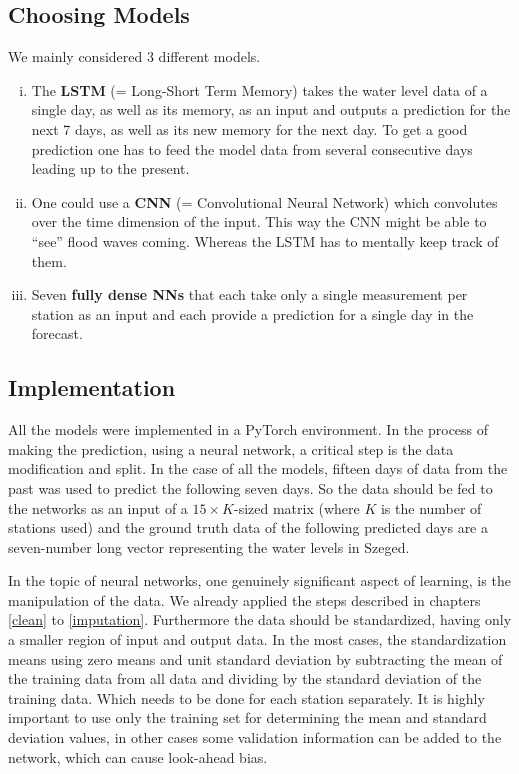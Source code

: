 \documentclass{article}
\newcommand{\tmstrong}[1]{\textbf{#1}}
\newenvironment{enumerateroman}{\begin{enumerate}[i.] }{\end{enumerate}}
\begin{document}
\subsection{Choosing Models}

We mainly considered 3 different models.
\begin{enumerateroman}
  \item The {\tmstrong{LSTM}} (= Long-Short Term Memory) takes the water level
  data of a single day, as well as its memory, as an input and outputs a
  prediction for the next 7 days, as well as its new memory for the next day.
  To get a good prediction one has to feed the model data from several
  consecutive days leading up to the present.
  
  \item One could use a {\tmstrong{CNN}} (= Convolutional Neural Network)
  which convolutes over the time dimension of the input. This way the CNN
  might be able to ``see'' flood waves coming. Whereas the LSTM has to
  mentally keep track of them.
  
  \item Seven {\tmstrong{fully dense NNs}} that each take only a single
  measurement per station as an input and each provide a prediction for a
  single day in the forecast.
\end{enumerateroman}

\subsection{Implementation}

All the models were implemented in a PyTorch environment. In the process of
making the prediction, using a neural network, a critical step is the data
modification and split. In the case of all the models, fifteen days of data
from the past was used to predict the following seven days. So the data should
be fed to the networks as an input of a $15 \times K$-sized matrix (where $K$ is the number of stations used) and the ground truth data of the
following predicted days are a seven-number long vector representing the water
levels in Szeged.

In the topic of neural networks, one genuinely significant aspect of learning,
is the manipulation of the data. We already applied the steps described in
chapters \ref{clean} to \ref{imputation}. Furthermore the data should be
standardized, having only a smaller region of input and output data. In the
most cases, the standardization means using zero means and unit standard
deviation by subtracting the mean of the training data from all data and
dividing by the standard deviation of the training data. Which needs to be
done for each station separately. It is highly important to use only the
training set for determining the mean and standard deviation values, in other
cases some validation information can be added to the network, which can cause
look-ahead bias.
\end{document}
